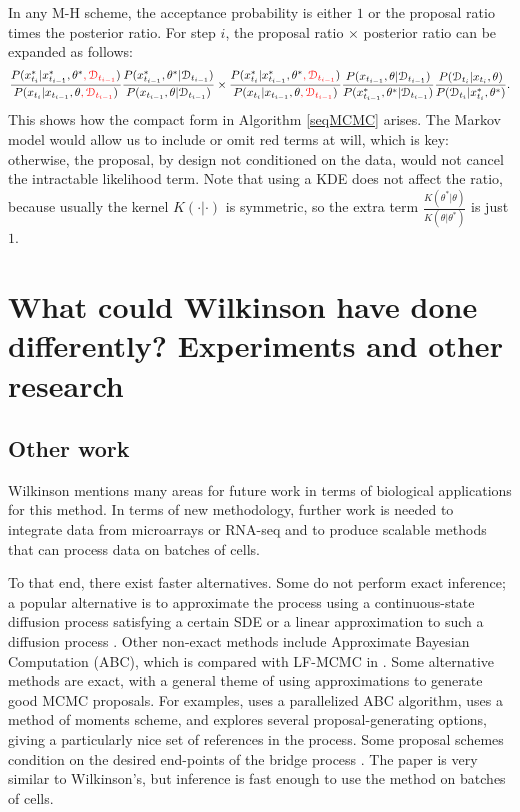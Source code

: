 \documentclass{article}
\newcommand\red[1]{\textcolor{red}{#1}}
\begin{document}
In any M-H scheme, the acceptance probability is either $1$ or the proposal ratio times the posterior ratio. For step $i$, the proposal ratio $\times$ posterior ratio can be expanded as follows:
$$ \frac{P(x_{t_{i}}^*| x_{t_{i-1}}^*,\theta^*\red{, \mathcal{D}_{t_{i-1}}})}{P(x_{t_{i}}| x_{t_{i-1}}, \theta \red{, \mathcal{D}_{t_{i-1}}})} 
\frac{P(x_{t_{i-1}}^*,\theta^*| \mathcal{D}_{t_{i-1}})}{P(x_{t_{i-1}}, \theta| \mathcal{D}_{t_{i-1}})}
\times 
\frac{P(x_{t_{i}}^*| x_{t_{i-1}}^*,\theta^*\red{, \mathcal{D}_{t_{i-1}}})}{P(x_{t_{i}}| x_{t_{i-1}}, \theta \red{, \mathcal{D}_{t_{i-1}}})}
\frac{ P(x_{t_{i-1}}, \theta| \mathcal{D}_{t_{i-1}})}{ P( x_{t_{i-1}}^*,\theta^*| \mathcal{D}_{t_{i-1}})}   
\frac{P(\mathcal{D}_{t_{i}}|x_{t_{i}}, \theta)}{P(\mathcal{D}_{t_{i}}|x_{t_{i}}^*, \theta^*)}.$$   
This shows how the compact form in Algorithm \ref{seqMCMC} arises. The Markov model would allow us to include or omit red terms at will, which is key: otherwise, the proposal, by design not conditioned on the data, would not cancel the intractable likelihood term. Note that using a KDE does not affect the ratio, because usually the kernel $K(\cdot|\cdot)$ is symmetric, so the extra term $\frac{K(\theta^*|\theta)}{K(\theta|\theta^*)}$ is just $1$.

\section{What could Wilkinson have done differently? Experiments and other research}


\subsection{Other work}
Wilkinson mentions many areas for future work in terms of biological applications for this method. In terms of new methodology, further work is needed to integrate data from microarrays or RNA-seq and to produce scalable methods that can process data on batches of cells.

To that end, there exist faster alternatives.  Some do not perform exact inference; a popular alternative is to approximate the process using a continuous-state diffusion process satisfying a certain SDE \cite{golightly2005bayesian,bayes_stoch_mod} or a linear approximation to such a diffusion process \cite{fearnhead2014inference}. Other non-exact methods include Approximate Bayesian Computation (ABC), which is compared with LF-MCMC in \cite{owen2014ABC_LF-MCMCcomparison}. Some alternative methods are exact, with a general theme of using approximations to generate good MCMC proposals. For examples, \cite{owen2014scalable} uses a parallelized ABC algorithm, \cite{milner2013moment} uses a method of moments scheme, and \cite{golightly2014smc_b_subtilis} explores several proposal-generating options, giving a particularly nice set of references in the process. Some proposal schemes condition on the desired end-points of the bridge process \cite{hobolth2009simulation}. The paper \cite{zechner2014scalable} is very similar to Wilkinson's, but inference is fast enough to use the method on batches of cells.
\end{document}
